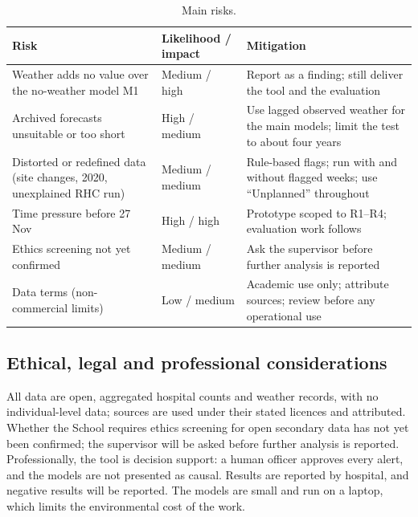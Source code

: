 \documentclass[12pt]{article}
\begin{document}
\begin{table}[h!]
\centering
\small
\begin{tabular}{|p{3.6cm}|p{1.9cm}|p{8.1cm}|}
 \hline
 Risk & Likelihood / impact & Mitigation \\
 \hline
 Weather adds no value over the no-weather model M1 & Medium / high & Report as a finding; still deliver the tool and the evaluation \\
 Archived forecasts unsuitable or too short & High / medium & Use lagged observed weather for the main models; limit the test to about four years \\
 Distorted or redefined data (site changes, 2020, unexplained RHC run) & Medium / medium & Rule-based flags; run with and without flagged weeks; use ``Unplanned'' throughout \\
 Time pressure before 27 Nov & High / high & Prototype scoped to R1--R4; evaluation work follows \\
 Ethics screening not yet confirmed & Medium / medium & Ask the supervisor before further analysis is reported \\
 Data terms (non-commercial limits) & Low / medium & Academic use only; attribute sources; review before any operational use \\
 \hline
\end{tabular}
\caption{Main risks.}
\label{table:risks}
\end{table}

\subsection{Ethical, legal and professional considerations}
All data are open, aggregated hospital counts and weather records, with no individual-level data; sources are used under their stated licences and attributed. Whether the School requires ethics screening for open secondary data has not yet been confirmed; the supervisor will be asked before further analysis is reported. Professionally, the tool is decision support: a human officer approves every alert, and the models are not presented as causal. Results are reported by hospital, and negative results will be reported. The models are small and run on a laptop, which limits the environmental cost of the work.

\printbibliography
\end{document}

